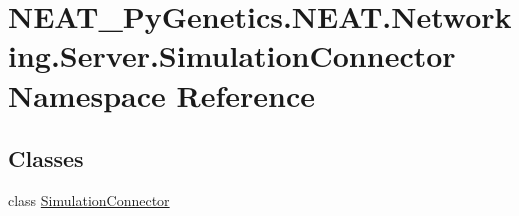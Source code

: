 \hypertarget{namespaceNEAT__PyGenetics_1_1NEAT_1_1Networking_1_1Server_1_1SimulationConnector}{}\section{N\+E\+A\+T\+\_\+\+Py\+Genetics.\+N\+E\+A\+T.\+Networking.\+Server.\+Simulation\+Connector Namespace Reference}
\label{namespaceNEAT__PyGenetics_1_1NEAT_1_1Networking_1_1Server_1_1SimulationConnector}
\subsection*{Classes}
\begin{DoxyCompactItemize}
\item 
class \hyperlink{classNEAT__PyGenetics_1_1NEAT_1_1Networking_1_1Server_1_1SimulationConnector_1_1SimulationConnector}{Simulation\+Connector}
\end{DoxyCompactItemize}

